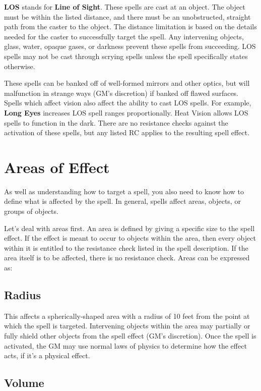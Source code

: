 \begin{multicols*}{2}
\textbf{LOS} stands for \textbf{Line of Sight}. These spells are cast at an object. The object must be within the listed distance, and there must be an unobstructed, straight path from the caster to the object. The distance limitation is based on the details needed for the caster to successfully target the spell. Any intervening objects, glass, water, opaque gases, or darkness prevent these spells from succeeding. LOS spells may not be cast through scrying spells unless the spell specifically states otherwise.

These spells can be banked off of well-formed mirrors and other optics, but will malfunction in strange ways (GM’s discretion) if banked off flawed surfaces. Spells which affect vision also affect the ability to cast LOS spells. For example, \textbf{Long Eyes} increases LOS spell ranges proportionally. Heat Vision allows LOS spells to function in the dark. There are no resistance checks against the activation of these spells, but any listed RC applies to the resulting spell effect.
\section{Areas of Effect}
As well as understanding how to target a spell, you also need to know how to define what is affected by the spell. In general, spells affect areas, objects, or groups of objects.

Let’s deal with areas first. An area is defined by giving a specific size to the spell effect. If the effect is meant to occur to objects within the area, then every object within it is entitled to the resistance check listed in the spell description. If the area itself is to be affected, there is no resistance check. Areas can be expressed as:
\subsection{Radius}

This affects a spherically-shaped area with a radius of 10 feet from the point at which the spell is targeted. Intervening objects within the area may partially or fully shield other objects from the spell effect (GM’s discretion). Once the spell is activated, the GM may use normal laws of physics to determine how the effect acts, if it’s a physical effect.
\subsection{Volume}


\end{multicols*}
